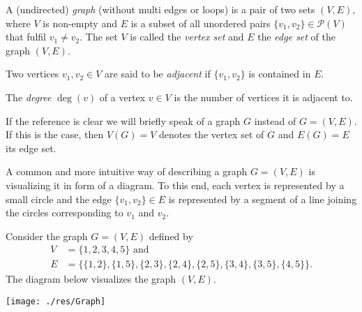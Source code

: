 \begin{defin}
\begin{thmlist}
\item A (undirected) \emph{graph} (without multi ed\-ges or loops) is a pair of two sets $(V,E)$, where $V$ is non-empty and $E$ is a subset of all unordered pairs $\lbrace v_1,v_2\rbrace\in\mathcal{P}(V)$ that fulfil $v_1\neq v_2$. The set $V$ is called the \emph{vertex set} and $E$ the \emph{edge set} of the graph $(V,E)$.
\item Two vertices $v_1,v_2\in V$ are said to be \emph{adjacent} if $\lbrace v_1,v_2\rbrace$ is contained in $E$.
\item The \emph{degree} $\deg(v)$ of a vertex $v\in V$ is the number of vertices it is adjacent to.
\end{thmlist}
\end{defin}


If the reference is clear we will briefly speak of a graph $G$ instead of $G=(V,E)$. If this is the case, then $V(G)=V$ denotes the vertex set of $G$ and $E(G)=E$ its edge set.

A common and more intuitive way of describing a graph $G=(V,E)$ is visualizing it in form of a diagram. To this end, each vertex is represented by a small circle and the edge $\lbrace v_1,v_2\rbrace\in E$ is represented by a segment of a line joining the circles corresponding to $v_1$ and $v_2$.

\begin{exam}\label{ex:Graph}
Consider the graph $G=(V,E)$ defined by
\begin{align*}
V&=\lbrace 1,2,3,4,5\rbrace \text{ and}\\
E&=\lbrace\lbrace 1,2\rbrace, \lbrace 1, 5\rbrace, \lbrace 2, 3\rbrace, \lbrace 2, 4\rbrace, \lbrace 2, 5 \rbrace, \lbrace 3, 4\rbrace, \lbrace 3, 5\rbrace, \lbrace 4, 5\rbrace\rbrace.
\end{align*}
The diagram below visualizes the graph $(V,E).$

\begin{center}
\texttt{[image: ./res/Graph]}
\end{center}
\end{exam}

